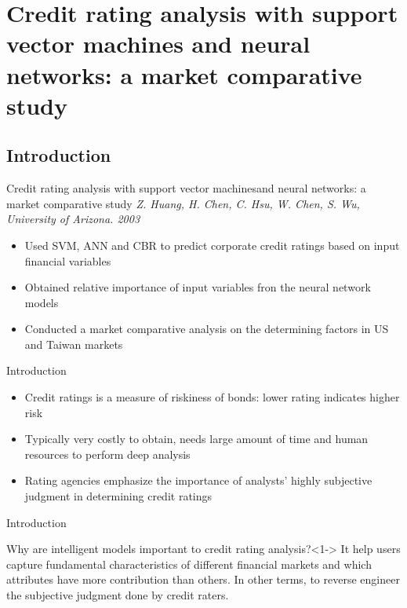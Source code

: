 \documentclass[10pt]{beamer}
\begin{document}
\section[Credit rating analysis with support vector machines and neural networks]{Credit rating analysis with support vector machines and neural networks: a market comparative study}
\subsection*{Introduction}
\begin{frame}{Credit rating analysis with support vector machines}{and neural networks: a market comparative study}
	\textit{Z. Huang, H. Chen, C. Hsu, W. Chen, S. Wu,\\ University of Arizona. 2003}
	\begin{itemize}[<1->]
		\item Used SVM, ANN and CBR to predict corporate credit ratings based on input financial variables
		\item Obtained relative importance of input variables fron the neural network models
		\item Conducted a market comparative analysis on the determining factors in US and Taiwan markets
	\end{itemize}
\end{frame}
\begin{frame}{Introduction}
	\begin{itemize}[<1->]
		\item Credit ratings is a measure of riskiness of bonds: lower rating indicates higher risk
		\item Typically very costly to obtain, needs large amount of time and human resources to perform deep analysis
		\item Rating agencies emphasize the importance of analysts' highly subjective judgment in determining credit ratings
	\end{itemize}
\end{frame}
\begin{frame}{Introduction}
	\begin{block}{Why are intelligent models important to credit rating analysis?}<1->
		It help users capture fundamental characteristics of different financial markets and which attributes have more contribution than others. In other terms, to reverse engineer the subjective judgment done by credit raters.
	\end{block}
\end{frame}
\end{document}
